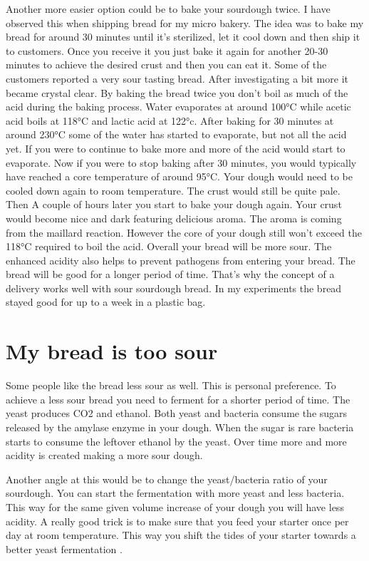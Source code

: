Another more easier option could be to bake your sourdough
twice. I have observed this when shipping bread for my micro
bakery. The idea was to bake my bread for around 30 minutes
until it's sterilized, let it cool down and then ship it
to customers. Once you receive it you just bake it again
for another 20-30 minutes to achieve the desired crust and
then you can eat it. Some of the customers reported a very sour
tasting bread. After investigating a bit more it became
crystal clear. By baking the bread twice you don't boil
as much of the acid during the baking process. Water
evaporates at around 100°C while acetic acid boils at
118°C and lactic acid at 122°c. After baking for 30 minutes
at around 230°C some of the water has started to evaporate,
but not all the acid yet. If you were to continue to bake more
and more of the acid would start to evaporate. Now if you were
to stop baking after 30 minutes, you would typically have reached
a core temperature of around 95°C. Your dough would need
to be cooled down again to room temperature. The crust would
still be quite pale. Then A couple of hours later you start
to bake your dough again. Your crust would become nice and
dark featuring delicious aroma. The aroma is coming from the
maillard reaction. However the core of your dough still won't
exceed the 118°C required to boil the acid. Overall your
bread will be more sour. The enhanced acidity also helps
to prevent pathogens from entering your bread. The bread
will be good for a longer period of time. That's why
the concept of a delivery works well with sour sourdough bread.
In my experiments the bread stayed good for up to a week
in a plastic bag.

\section{My bread is too sour}

Some people like the bread less sour as well. This
is personal preference. To achieve a less sour bread
you need to ferment for a shorter period of time.
The yeast produces CO2 and ethanol. Both yeast and
bacteria consume the sugars released by the amylase enzyme
in your dough. When the sugar is rare bacteria starts to
consume the leftover ethanol by the yeast. Over time more
and more acidity is created making a more sour dough.

Another angle at this would be to change the yeast/bacteria
ratio of your sourdough. You can start the fermentation with
more yeast and less bacteria. This way for the same given
volume increase of your dough you will have less acidity.
A really good trick is to make sure that you feed your starter
once per day at room temperature. This way you shift
the tides of your starter towards a better yeast fermentation \cite*{more+active+starter}.

